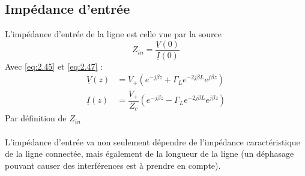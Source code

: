 	\subsection{Impédance d'entrée}
	L'impédance d'entrée de la ligne est celle vue par la source 
	\begin{equation}
	Z_{in} = \dfrac{\underline{V}(0)}{\underline{I}(0)}
	\end{equation}
	Avec \autoref{eq:2.45} et \autoref{eq:2.47} :
	\begin{equation}
	\begin{split}
	\underline{V}(z) &= V_+\left(e^{-j\beta z} + \Gamma_L e^{-2j\beta L}e^{j\beta z}\right)\\
	\underline{I}(z) &= \dfrac{V_+}{Z_c} \left(e^{-j\beta z} - \Gamma_L e^{-2j\beta L}e^{j\beta z}\right)	
	\end{split}
	\end{equation}
	Par définition de $Z_{in}$\\
	\ \\
	
	L'impédance d'entrée va non seulement dépendre de l'impédance caractéristique de la ligne connectée, mais également de 
	la longueur de la ligne (un déphasage pouvant causer des interférences est à prendre en compte).
	
	
